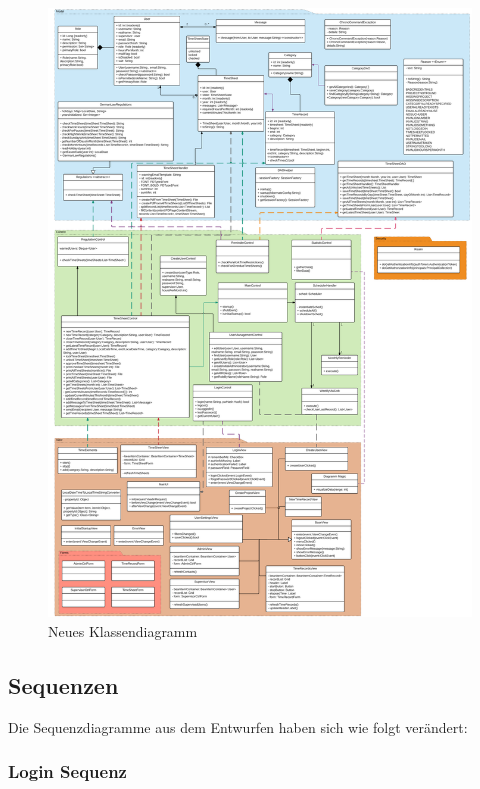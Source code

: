 \begin{figure}[H]
	\centering
	\includegraphics[scale=0.17]{Class-Diagramm-new.pdf}
	\caption{Neues Klassendiagramm}
\end{figure}
\newpage

\subsection{Sequenzen}
Die Sequenzdiagramme aus dem Entwurfen haben sich wie folgt verändert:
\subsubsection{Login Sequenz}

